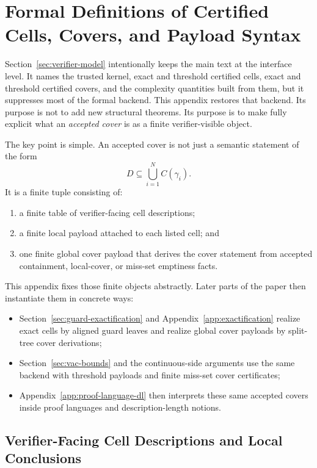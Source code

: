 \section{Formal Definitions of Certified Cells, Covers, and Payload Syntax}
\label{app:cell-payload-syntax}

Section~\ref{sec:verifier-model} intentionally keeps the main text at the interface level. It names the trusted kernel, exact and threshold certified cells, exact and threshold certified covers, and the complexity quantities built from them, but it suppresses most of the formal backend. This appendix restores that backend. Its purpose is not to add new structural theorems. Its purpose is to make fully explicit what an \emph{accepted cover} is as a finite verifier-visible object.

The key point is simple. An accepted cover is not just a semantic statement of the form
\[
D\subseteq \bigcup_{i=1}^N C(\gamma_i).
\]
It is a finite tuple consisting of:
\begin{enumerate}
    \item a finite table of verifier-facing cell descriptions;
    \item a finite local payload attached to each listed cell; and
    \item one finite global cover payload that derives the cover statement from accepted containment, local-cover, or miss-set emptiness facts.
\end{enumerate}
This appendix fixes those finite objects abstractly. Later parts of the paper then instantiate them in concrete ways:
\begin{itemize}
    \item Section~\ref{sec:guard-exactification} and Appendix~\ref{app:exactification} realize exact cells by aligned guard leaves and realize global cover payloads by split-tree cover derivations;
    \item Section~\ref{sec:vac-bounds} and the continuous-side arguments use the same backend with threshold payloads and finite miss-set cover certificates;
    \item Appendix~\ref{app:proof-language-dl} then interprets these same accepted covers inside proof languages and description-length notions.
\end{itemize}

\subsection{Verifier-Facing Cell Descriptions and Local Conclusions}

